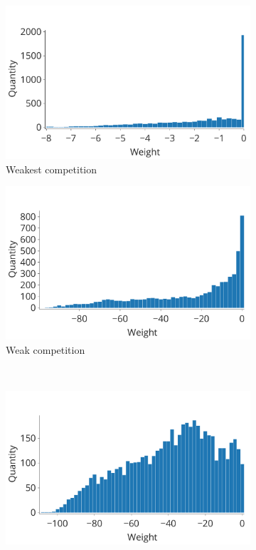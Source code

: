 \documentclass[a4paper,10pt]{article}
\begin{document}
\begin{figure}
\centering
\begin{subfigure}{0.45\textwidth}
    \includegraphics[width=\textwidth,keepaspectratio=true]{competition_distribution_worst.pdf}
    \caption{Weakest competition}
\end{subfigure}
\begin{subfigure}{0.45\textwidth}
    \includegraphics[width=\textwidth,keepaspectratio=true]{competition_distribution_medium_bad.pdf}
    \caption{Weak competition}
\end{subfigure}
\\
\begin{subfigure}{0.45\textwidth}
    \includegraphics[width=\textwidth,keepaspectratio=true]{competition_distribution_medium_good.pdf}

\end{subfigure}
\end{figure}
\end{document}
